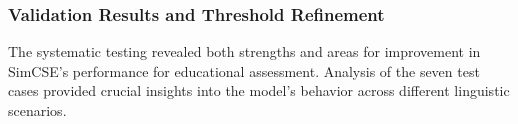 {%





\subsubsection{Validation Results and Threshold Refinement}
\label{subsubsec:validation_results}

The systematic testing revealed both strengths and areas for improvement in SimCSE's performance for educational assessment. Analysis of the seven test cases provided crucial insights into the model's behavior across different linguistic scenarios.

}
